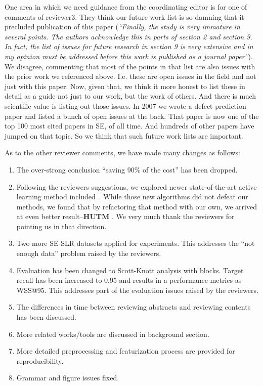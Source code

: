 \documentclass{svjour3}
\theoremstyle{break}
\begin{document}
One area in which we need guidance from the coordinating editor is for one of  comments of reviewer3. They think our future work list is so damning that it precluded publication of this paper ({\em ``Finally, the study is very immature in several points. The authors acknowledge this in parts of section 2 and section 9. In fact, the list of issues for future research in section 9 is very extensive and in my opinion must be addressed before this work is published as a journal paper''}). We disagree, commenting that most of the points in that list are also issues with the prior work we referenced above. I.e. these are open issues in the field and not just with this paper. Now, given that, we think it more honest to list these in detail as a guide not just to our work, but the work of others.
And there is much scientific value is listing out those issues.  In 2007 we wrote a defect prediction paper and listed a bunch of open issues at the back. That paper is now one of the top 100 most cited papers in SE, of all time. And hundreds of other papers have jumped on that topic. So we  think that such future work lists are important. 

As to the other reviewer comments, we have made many changes as follows:

\begin{enumerate}
\item
The over-strong conclusion ``saving 90\% of the cost'' has been dropped.
\item
Following the reviewers suggestions, we explored newer state-of-the-art active learning method included~\cite{miwa2014reducing}. While those new algorithms did not defeat our methods, we found that by refactoring that method with our own, we arrived at even better result--\textbf{HUTM} . We very much thank the reviewers for pointing us in  that direction.
\item
Two more SE SLR datasets applied for experiments. This addresses the ``not enough data'' problem raised by the reviewers.
\item
Evaluation has been changed to Scott-Knott analysis with blocks. Target recall has been increased to 0.95 and results in a performance metrics as WSS@95.  This addresses part of the evaluation issues raised by the reviewers.

\item
The differences in time between reviewing abstracts and reviewing contents has been discussed.
\item
More related works/tools are discussed in background section.
\item
More detailed preprocessing and featurization process are provided for reproducibility.
\item
Grammar and figure issues fixed.
\end{enumerate}
\end{document}
